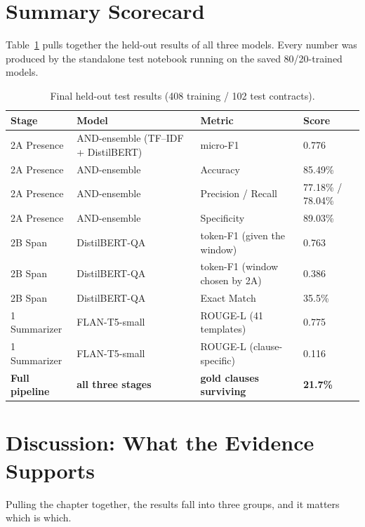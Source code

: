 \section{Summary Scorecard}
Table~\ref{tab:scorecard} pulls together the held-out results of all three models. Every number was produced by the standalone test notebook running on the saved 80/20-trained models.

\begin{table}[ht]
\centering
\caption{Final held-out test results (408 training / 102 test contracts).}
\label{tab:scorecard}
\small
\begin{tabular}{llll}
\toprule
\textbf{Stage} & \textbf{Model} & \textbf{Metric} & \textbf{Score}\\
\midrule
2A Presence & AND-ensemble (TF--IDF + DistilBERT) & micro-F1  & 0.776\\
2A Presence & AND-ensemble & Accuracy               & 85.49\%\\
2A Presence & AND-ensemble & Precision / Recall     & 77.18\% / 78.04\%\\
2A Presence & AND-ensemble & Specificity            & 89.03\%\\
2B Span     & DistilBERT-QA & token-F1 (given the window) & 0.763\\
2B Span     & DistilBERT-QA & token-F1 (window chosen by 2A) & 0.386\\
2B Span     & DistilBERT-QA & Exact Match           & 35.5\%\\
1 Summarizer & FLAN-T5-small & ROUGE-L (41 templates)  & 0.775\\
1 Summarizer & FLAN-T5-small & ROUGE-L (clause-specific) & 0.116\\
\midrule
\textbf{Full pipeline} & \textbf{all three stages} & \textbf{gold clauses surviving} & \textbf{21.7\%}\\
\bottomrule
\end{tabular}
\end{table}

\section{Discussion: What the Evidence Supports}
Pulling the chapter together, the results fall into three groups, and it matters which is which.


